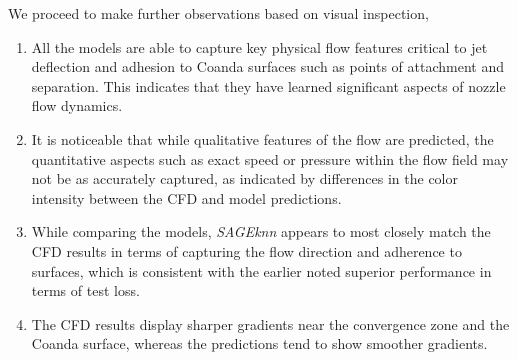 We proceed to make further observations based on visual inspection, 
\begin{enumerate}
    \item All the models are able to capture key physical flow features critical to jet deflection and adhesion to Coanda surfaces such as points of attachment and separation. This indicates that they have learned significant aspects of nozzle flow dynamics.
    \item It is noticeable that while qualitative features of the flow are predicted, the quantitative aspects such as exact speed or pressure within the flow field may not be as accurately captured, as indicated by differences in the color intensity between the CFD and model predictions.
    \item While comparing the models, \textit{SAGEknn} appears to most closely match the CFD results in terms of capturing the flow direction and adherence to surfaces, which is consistent with the earlier noted superior performance in terms of test loss.
    \item The CFD results display sharper gradients near the convergence zone and the Coanda surface, whereas the predictions tend to show smoother gradients.
\end{enumerate}
